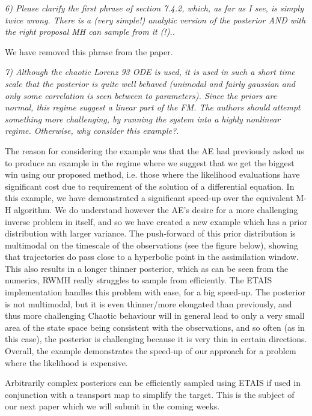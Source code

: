 \documentclass{article}
\newcommand{\comment}[2]{\vspace{0.6cm}{\bf Comment:} {\it #1.}

\vspace{0.3cm}{\bf Answer:} #2}
\begin{document}
\comment{6) Please clarify the first phrase of section 7.4.2, which, as far as I see, is simply twice wrong. There is a (very simple!) analytic version of the posterior AND with the right proposal MH can sample from it (!).}{We have removed this phrase from the paper.}

\comment{7) Although the chaotic Lorenz 93 ODE is used, it is used in such a short time scale that the posterior is quite well behaved (unimodal and fairly gaussian and only some correlation is seen between to parameters). Since the priors are normal, this regime suggest a linear part of the FM. The authors should attempt something more challenging, by running the system into a highly nonlinear regime. Otherwise, why consider this example?}{The reason for considering the example was that the AE had previously asked us to produce an example in the regime where we suggest that we get the biggest win using our proposed method, i.e. those where the likelihood evaluations have significant cost due to requirement of the solution of a differential equation. In this example, we have demonstrated a significant speed-up over the equivalent M-H algorithm. We do understand however the AE's desire for a more challenging inverse problem in itself, and so we have created a new example which has a prior distribution with larger variance. The push-forward of this prior distribution is multimodal on the timescale of the observations (see the figure below), showing that trajectories do pass close to a hyperbolic point in the assimilation window. This also results in a longer thinner posterior, which as can be seen from the numerics, RWMH really struggles to sample from efficiently. The ETAIS implementation handles this problem with ease, for a big speed-up. The posterior is not multimodal, but it is even thinner/more elongated than previously, and thus more challenging Chaotic behaviour will in general lead to only a very small area of the state space being consistent with the observations, and so often (as in this case), the posterior is challenging because it is very thin in certain directions. Overall, the example demonstrates the speed-up of our approach for a problem where the likelihood is expensive.

Arbitrarily complex posteriors can be efficiently sampled using ETAIS if used in conjunction with a transport map to simplify the target. This is the subject of our next paper which we will submit in the coming weeks.}
\end{document}
